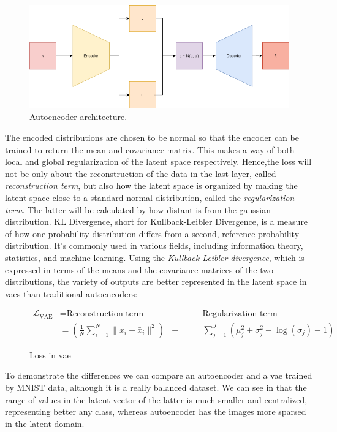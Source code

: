 \documentclass[11pt, a4paper]{article}
\begin{document}
	\begin{figure}[H]
		\centering
		\includegraphics[width=15cm]{imgs/relatedwork/vae}
		\caption{Autoencoder architecture.}
		\label{fig:related-vae}
	\end{figure}
	The encoded distributions are chosen to be normal so that the encoder can be trained to return the mean and covariance matrix. This makes a way of both local and global regularization of the latent space respectively. Hence,the loss will not be only about the reconstruction of the data in the last layer, called \textit{reconstruction term}, but also how the latent space is organized by making the latent space close to a standard normal distribution, called the \textit{regularization term}. The latter will be calculated by how distant is from the gaussian distribution.
	KL Divergence, short for Kullback-Leibler Divergence, is a measure of how one probability distribution differs from a second, reference probability distribution. It's commonly used in various fields, including information theory, statistics, and machine learning.
	Using the \textit{Kullback-Leibler divergence}, which is expressed in terms of the means and the covariance matrices of the two distributions, the variety of outputs are better represented in the latent space in \gls{vae}s than traditional autoencoders:
	\begin{figure}[H]
		\begin{align*}
			\mathcal{L}_{\text{VAE}} &= \text{Reconstruction term} &+&\qquad \text{Regularization term}\\
			&= (\frac{1}{N} \sum_{i=1}^{N} \| x_i - \bar{x}_i \|^2) &+& \qquad \sum_{j=1}^{J} \left(\mu_j^2 + \sigma_j^2  - \log(\sigma_j)  - 1 \right)
		\end{align*}
		\caption{Loss in \gls{vae}}
	\end{figure}
	To demonstrate the differences we can compare an autoencoder and a \gls{vae} trained by MNIST data, although it is a really balanced dataset. We can see in  that the range of values in the latent vector of the latter is much smaller and centralized, representing better any class, whereas autoencoder has the images more sparsed in the latent domain. %
\end{document}
